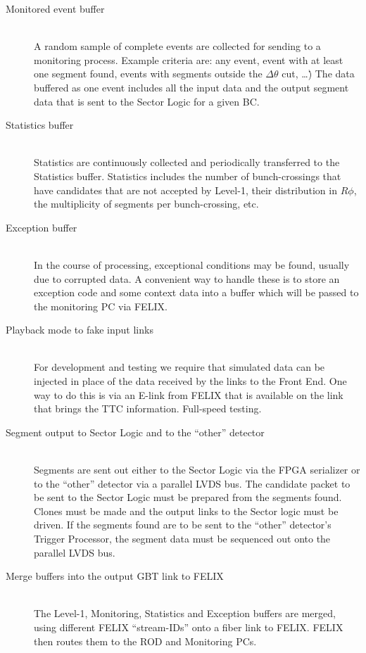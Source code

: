 \begin{description}
  \item[Monitored event buffer] \hfill \\
  A random sample of complete events are collected for sending to a monitoring process.
  Example criteria are: any event, event with at least one segment found, events with segments outside the $\Delta\theta$ cut, \ldots\.)
  The data buffered as one event includes all the input data and the output segment data that is sent to the Sector Logic for a given BC.

  \item[Statistics buffer] \hfill \\
  Statistics are continuously collected and periodically transferred to the Statistics buffer.
  Statistics includes the number of bunch-crossings that have candidates that are not accepted by Level-1, their distribution in $R\phi$,
  the multiplicity of segments per bunch-crossing, etc.

  \item[Exception buffer] \hfill \\
  In the course of processing, exceptional conditions may be found, usually due to corrupted data.
  A convenient way to handle these is to store an exception code and some context data into a buffer which will be passed to the monitoring PC via FELIX.

  \item[Playback mode to fake input links] \hfill \\
  For development and testing we require that simulated data can be injected in place of the data received by the links to the Front End.
  One way to do this is via an E-link from FELIX that is available on the link that brings the TTC information.
  Full-speed testing.

  \item[Segment output to Sector Logic and to the ``other'' detector] \hfill \\
  Segments are sent out either to the Sector Logic via the FPGA serializer or to the ``other'' detector via a parallel LVDS bus.
  The candidate packet to be sent to the Sector Logic must be prepared from the segments found.
  Clones must be made and the output links to the Sector logic must be driven.
  If the segments found are to be sent to the ``other'' detector's Trigger Processor,
  the segment data must be sequenced out onto the parallel LVDS bus.

  \item[Merge buffers into the output GBT link to FELIX] \hfill \\
  The Level-1, Monitoring, Statistics and Exception buffers are merged, using different FELIX ``stream-IDs'' onto a fiber link to FELIX.
  FELIX then routes them to the ROD and Monitoring PCs.

\end{description}

